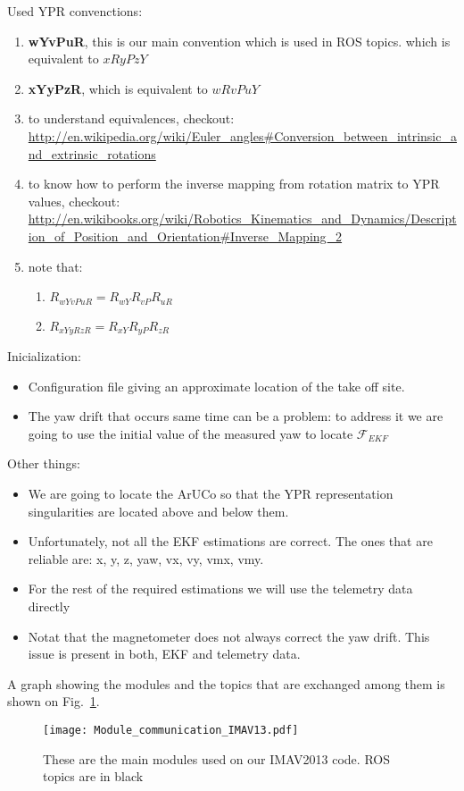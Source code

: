 \documentclass[a4paper,10pt]{article}
\begin{document}
  \newpage
Used YPR convenctions:
\begin{enumerate}
 \item \textbf{wYvPuR}, this is our main convention which is used in {ROS} topics. which is equivalent to $xRyPzY$
 \item \textbf{xYyPzR}, which is equivalent to $wRvPuY$
 \item to understand equivalences, checkout: 
 \href{http://en.wikipedia.org/wiki/Euler\_angles\#Conversion\_between\_intrinsic\_and\_extrinsic\_rotations}{http://en.wikipedia.org/wiki/Euler\_angles\#Conversion\_between\_intrinsic\_and\_extrinsic\_rotations}
 \item to know how to perform the inverse mapping from rotation matrix to YPR values, checkout:
 \href{http://en.wikibooks.org/wiki/Robotics\_Kinematics\_and\_Dynamics/Description\_of\_Position\_and\_Orientation\#Inverse\_Mapping\_2}{http://en.wikibooks.org/wiki/Robotics\_Kinematics\_and\_Dynamics/Description\_of\_Position\_and\_Orientation\#Inverse\_Mapping\_2}
 \item note that:
 \begin{enumerate}
  \item $R_{wYvPuR} = R_{wY}R_{vP}R_{uR}$
  \item $R_{xYyRzR} = R_{xY}R_{yP}R_{zR}$
 \end{enumerate}
\end{enumerate}

Inicialization:
\begin{itemize}
 \item Configuration file giving an approximate location of the take off site.
 \item The yaw drift that occurs same time can be a problem: to address it we are going to use the initial value of the measured yaw to locate $\mathcal{F}_{EKF}$
\end{itemize}

Other things:
\begin{itemize}
 \item We are going to locate the {ArUCo} so that the YPR representation singularities are located above and below them.
 \item Unfortunately, not all the EKF estimations are correct. The ones that are reliable are: x, y, z, yaw, vx, vy, vmx, vmy.
 \item For the rest of the required estimations we will use the telemetry data directly
 \item Notat that the magnetometer does not always correct the yaw drift. This issue is present in both, EKF and telemetry data.
\end{itemize}

A graph showing the modules and the topics that are exchanged among them is shown on Fig.~\ref{fig:IMAV_Modules}.

\begin{figure}[tbh!]
\centering
\texttt{[image: Module\_communication\_IMAV13.pdf]}
\caption{
	  These are the main modules used on our IMAV2013 code. ROS topics are in black
	  } \label{fig:IMAV_Modules}
\end{figure}
\end{document}

